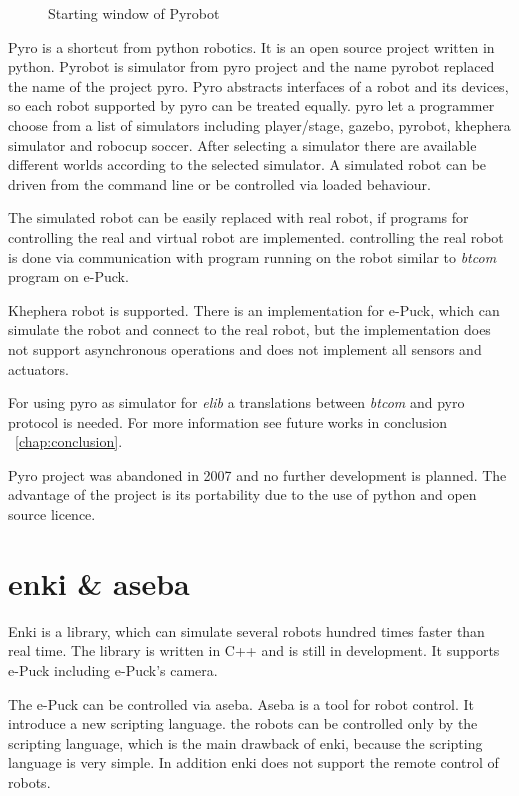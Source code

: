 \begin{figure}
\begin{picture}
    \end{picture}%
  \fi
  \caption{\label{pic:pyrobot_win}%
   Starting window of Pyrobot}
  \end{figure}



  Pyro is a shortcut from python robotics. It is an open source project written in python. Pyrobot is simulator
  from pyro project and the name pyrobot replaced the name of the project pyro. 
  Pyro abstracts interfaces of a robot and
  its devices, so each robot supported by pyro can be treated equally.
  pyro let a programmer choose from a list of simulators including player/stage, gazebo, pyrobot, khephera simulator
  and robocup soccer.
  After selecting a simulator there are available different worlds according to the selected simulator.
  A simulated robot can be driven from the command line or be controlled via loaded behaviour.
  
  The simulated robot can be easily replaced with real robot, if programs for controlling the real 
  and virtual robot are implemented. 	
  controlling the real robot is done via communication with program running on the robot similar 
  to {\it btcom} program on e-Puck.
  
  Khephera robot is supported. There is an implementation for e-Puck, which can simulate the robot
  and connect to the real robot, but the implementation does not support asynchronous operations and does 
  not implement all sensors and actuators.
  
  For using pyro as simulator for {\it elib} a translations between {\it btcom} and pyro protocol is needed.
  For more information see future works in conclusion ~\ref{chap:conclusion}.	
  
  Pyro project was abandoned in 2007 and no further development is planned.
  The advantage of the project is its portability due to the use of python and open source licence.
\section{enki \& aseba\cite{enki}}
  Enki is a library, which can simulate several robots hundred times faster than real time.
  The library is written in C++ and is still in development. It supports e-Puck including e-Puck's camera. 
  
  The e-Puck can be controlled via aseba. Aseba is a tool for robot control.
  It introduce a new scripting language. 
  the robots can be controlled only by the scripting language, which is the main
  drawback of enki, because the scripting language is very simple.
  In addition enki does not support the remote control of robots.
